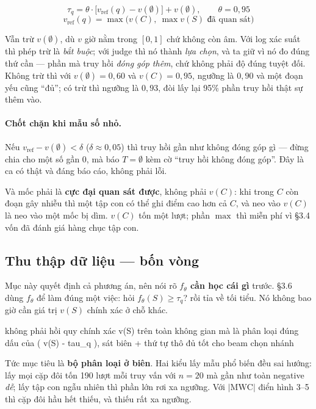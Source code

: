 \documentclass[11pt,a4paper]{article}
\begin{document}
\[ \tau_q=\theta\cdot\big[v_{\text{ref}}(q)-v(\emptyset)\big]+v(\emptyset),\qquad\theta=0{,}95 \]
\[ v_{\text{ref}}(q)=\max\big(v(C),\ \max v(S)\text{ đã quan sát}\big) \]

Vẫn trừ $v(\emptyset)$, dù $v$ giờ nằm trong $[0,1]$ chứ không còn âm. Với log xác suất thì
phép trừ là \emph{bắt buộc}; với judge thì nó thành \emph{lựa chọn}, và ta giữ vì nó đo đúng
thứ cần --- phần mà truy hồi \emph{đóng góp thêm}, chứ không phải độ đúng tuyệt đối. Không
trừ thì với $v(\emptyset)=0{,}60$ và $v(C)=0{,}95$, ngưỡng là $0{,}90$ và một đoạn yếu cũng
``đủ''; có trừ thì ngưỡng là $0{,}93$, đòi lấy lại 95\% phần truy hồi thật sự thêm vào.

\paragraph{Chốt chặn khi mẫu số nhỏ.} Nếu $v_{\text{ref}}-v(\emptyset)<\delta$
($\delta\approx 0{,}05$) thì truy hồi gần như không đóng góp gì --- đừng chia cho một số gần
0, mà báo $T=\emptyset$ kèm cờ ``truy hồi không đóng góp''. Đây là ca có thật và đáng báo
cáo, không phải lỗi.

Và mốc phải là \textbf{cực đại quan sát được}, không phải $v(C)$: khi trong $C$ còn đoạn gây
nhiễu thì một tập con có thể ghi điểm cao hơn cả $C$, và neo vào $v(C)$ là neo vào một mốc
bị dìm. $v(C)$ tốn một lượt; phần $\max$ thì miễn phí vì \S3.4 vốn đã đánh giá hàng chục tập
con.

\subsection{Thu thập dữ liệu --- bốn vòng}

Mục này quyết định cả phương án, nên nói rõ \textbf{$f_\theta$ cần học cái gì} trước. \S3.6
dùng $f_\theta$ để làm đúng một việc: hỏi $f_\theta(S)\ge\tau_q$? rồi tỉa về tối tiểu. Nó
không bao giờ cần giá trị $v(S)$ chính xác ở chỗ khác.

\begin{dia}
không phải   hồi quy chính xác v(S) trên toàn không gian
mà là        phân loại đúng dấu của ( v(S) - tau_q ), sát biên
             + thứ tự thô đủ tốt cho beam chọn nhánh
\end{dia}

Tức mục tiêu là \textbf{bộ phân loại ở biên}. Hai kiểu lấy mẫu phổ biến đều sai hướng: lấy
mọi cặp đôi tốn 190 lượt mỗi truy vấn với $n=20$ mà gần như toàn negative \emph{dễ}; lấy tập
con ngẫu nhiên thì phần lớn rơi xa ngưỡng. Với $|\mathrm{MWC}|$ điển hình 3--5 thì cặp đôi
hầu hết thiếu, và thiếu rất xa ngưỡng.
\end{document}
